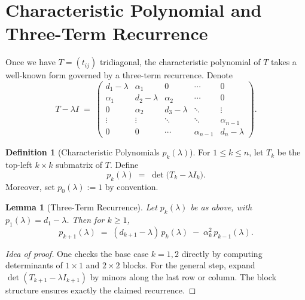 \documentclass[letterpaper,11pt,oneside,reqno]{article}
\numberwithin{equation}{section}
\newtheorem{lemma}[proposition]{Lemma}
\theoremstyle{definition}
\newtheorem{definition}[proposition]{Definition}
\begin{document}
\section{Characteristic Polynomial and Three-Term Recurrence}
\label{sec:3term}

Once we have $T = (t_{ij})$ tridiagonal, the characteristic polynomial of $T$ takes a well-known form governed by a three-term recurrence. Denote
\[
  T - \lambda I \;=\;
  \begin{pmatrix}
    d_1 - \lambda & \alpha_1 & 0 & \cdots & 0 \\
    \alpha_1 & d_2 - \lambda & \alpha_2 & \cdots & 0 \\
    0        & \alpha_2 & d_3 - \lambda & \ddots & \vdots \\
    \vdots   & \vdots   & \ddots & \ddots & \alpha_{n-1} \\
    0        & 0        & \cdots & \alpha_{n-1} & d_n - \lambda
  \end{pmatrix}.
\]

\begin{definition}[Characteristic Polynomials $p_k(\lambda)$]
For $1 \le k \le n$, let $T_k$ be the top-left $k \times k$ submatrix of $T$. Define
\[
  p_k(\lambda) \;=\; \det\bigl(T_k - \lambda I_k\bigr).
\]
Moreover, set $p_0(\lambda):=1$ by convention.
\end{definition}

\begin{lemma}[Three-Term Recurrence]
\label{lem:3term-recurrence}
Let $p_k(\lambda)$ be as above, with $p_1(\lambda) = d_1 - \lambda$. Then for $k \ge 1$,
\[
  p_{k+1}(\lambda)
  \;=\;
  (d_{k+1} - \lambda)\,p_k(\lambda)
  \;-\;\alpha_k^2\,p_{k-1}(\lambda).
\]
\end{lemma}

\begin{proof}[Idea of proof]
One checks the base case $k=1,2$ directly by computing determinants of $1\times1$ and $2\times2$ blocks. For the general step, expand $\det(T_{k+1}-\lambda I_{k+1})$ by minors along the last row or column. The block structure ensures exactly the claimed recurrence.
\end{proof}
\end{document}
